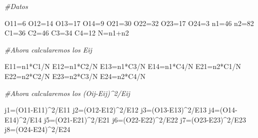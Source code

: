 \documentclass[
  a4paper,
  oneside,
  openany]{book}
\newenvironment{Shaded}{\begin{snugshade}}{\end{snugshade}}
\newcommand{\CommentTok}[1]{\textcolor[rgb]{0.56,0.35,0.01}{\textit{#1}}}
\newcommand{\DecValTok}[1]{\textcolor[rgb]{0.00,0.00,0.81}{#1}}
\newcommand{\NormalTok}[1]{#1}
\newcommand{\OtherTok}[1]{\textcolor[rgb]{0.56,0.35,0.01}{#1}}
\newcommand{\SpecialCharTok}[1]{\textcolor[rgb]{0.00,0.00,0.00}{#1}}
\begin{document}
\begin{Shaded}
\begin{Highlighting}[]
\CommentTok{\#Datos}

\NormalTok{O11}\OtherTok{=}\DecValTok{6}
\NormalTok{O12}\OtherTok{=}\DecValTok{14}
\NormalTok{O13}\OtherTok{=}\DecValTok{17}
\NormalTok{O14}\OtherTok{=}\DecValTok{9}
\NormalTok{O21}\OtherTok{=}\DecValTok{30}
\NormalTok{O22}\OtherTok{=}\DecValTok{32}
\NormalTok{O23}\OtherTok{=}\DecValTok{17}
\NormalTok{O24}\OtherTok{=}\DecValTok{3}
\NormalTok{n1}\OtherTok{=}\DecValTok{46}
\NormalTok{n2}\OtherTok{=}\DecValTok{82}
\NormalTok{C1}\OtherTok{=}\DecValTok{36}
\NormalTok{C2}\OtherTok{=}\DecValTok{46}
\NormalTok{C3}\OtherTok{=}\DecValTok{34}
\NormalTok{C4}\OtherTok{=}\DecValTok{12}
\NormalTok{N}\OtherTok{=}\NormalTok{n1}\SpecialCharTok{+}\NormalTok{n2}

\CommentTok{\#Ahora calcularemos los Eij}

\NormalTok{E11}\OtherTok{=}\NormalTok{n1}\SpecialCharTok{*}\NormalTok{C1}\SpecialCharTok{/}\NormalTok{N}
\NormalTok{E12}\OtherTok{=}\NormalTok{n1}\SpecialCharTok{*}\NormalTok{C2}\SpecialCharTok{/}\NormalTok{N}
\NormalTok{E13}\OtherTok{=}\NormalTok{n1}\SpecialCharTok{*}\NormalTok{C3}\SpecialCharTok{/}\NormalTok{N}
\NormalTok{E14}\OtherTok{=}\NormalTok{n1}\SpecialCharTok{*}\NormalTok{C4}\SpecialCharTok{/}\NormalTok{N}
\NormalTok{E21}\OtherTok{=}\NormalTok{n2}\SpecialCharTok{*}\NormalTok{C1}\SpecialCharTok{/}\NormalTok{N}
\NormalTok{E22}\OtherTok{=}\NormalTok{n2}\SpecialCharTok{*}\NormalTok{C2}\SpecialCharTok{/}\NormalTok{N}
\NormalTok{E23}\OtherTok{=}\NormalTok{n2}\SpecialCharTok{*}\NormalTok{C3}\SpecialCharTok{/}\NormalTok{N}
\NormalTok{E24}\OtherTok{=}\NormalTok{n2}\SpecialCharTok{*}\NormalTok{C4}\SpecialCharTok{/}\NormalTok{N}

\CommentTok{\#Ahora calcularemos los (Oij{-}Eij)\^{}2/Eij}

\NormalTok{j1}\OtherTok{=}\NormalTok{(O11}\SpecialCharTok{{-}}\NormalTok{E11)}\SpecialCharTok{\^{}}\DecValTok{2}\SpecialCharTok{/}\NormalTok{E11}
\NormalTok{j2}\OtherTok{=}\NormalTok{(O12}\SpecialCharTok{{-}}\NormalTok{E12)}\SpecialCharTok{\^{}}\DecValTok{2}\SpecialCharTok{/}\NormalTok{E12}
\NormalTok{j3}\OtherTok{=}\NormalTok{(O13}\SpecialCharTok{{-}}\NormalTok{E13)}\SpecialCharTok{\^{}}\DecValTok{2}\SpecialCharTok{/}\NormalTok{E13}
\NormalTok{j4}\OtherTok{=}\NormalTok{(O14}\SpecialCharTok{{-}}\NormalTok{E14)}\SpecialCharTok{\^{}}\DecValTok{2}\SpecialCharTok{/}\NormalTok{E14}
\NormalTok{j5}\OtherTok{=}\NormalTok{(O21}\SpecialCharTok{{-}}\NormalTok{E21)}\SpecialCharTok{\^{}}\DecValTok{2}\SpecialCharTok{/}\NormalTok{E21}
\NormalTok{j6}\OtherTok{=}\NormalTok{(O22}\SpecialCharTok{{-}}\NormalTok{E22)}\SpecialCharTok{\^{}}\DecValTok{2}\SpecialCharTok{/}\NormalTok{E22}
\NormalTok{j7}\OtherTok{=}\NormalTok{(O23}\SpecialCharTok{{-}}\NormalTok{E23)}\SpecialCharTok{\^{}}\DecValTok{2}\SpecialCharTok{/}\NormalTok{E23}
\NormalTok{j8}\OtherTok{=}\NormalTok{(O24}\SpecialCharTok{{-}}\NormalTok{E24)}\SpecialCharTok{\^{}}\DecValTok{2}\SpecialCharTok{/}\NormalTok{E24}


\end{Highlighting}
\end{Shaded}
\end{document}
